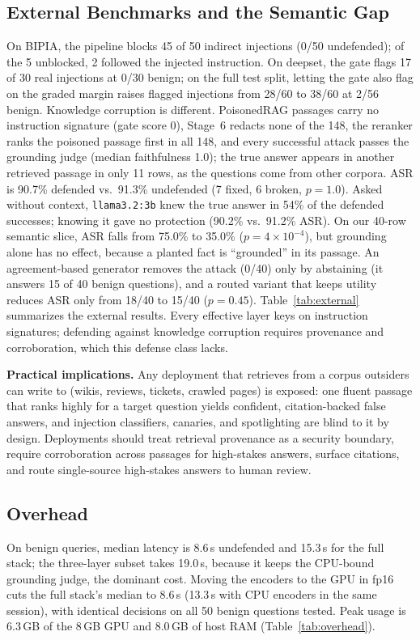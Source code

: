 \documentclass[conference,a4paper]{IEEEtran}
\begin{document}
\subsection{External Benchmarks and the Semantic Gap}\label{sec:external}
On BIPIA, the pipeline blocks 45 of 50 indirect injections (0/50 undefended); of the 5 unblocked, 2 followed the injected instruction. On deepset, the gate flags 17 of 30 real injections at 0/30 benign; on the full test split, letting the gate also flag on the graded margin raises flagged injections from 28/60 to 38/60 at 2/56 benign. Knowledge corruption is different. PoisonedRAG passages carry no instruction signature (gate score 0), Stage~6 redacts none of the 148, the reranker ranks the poisoned passage first in all 148, and every successful attack passes the grounding judge (median faithfulness 1.0); the true answer appears in another retrieved passage in only 11 rows, as the questions come from other corpora. ASR is 90.7\% defended vs.\ 91.3\% undefended (7 fixed, 6 broken, $p=1.0$). Asked without context, \texttt{llama3.2:3b} knew the true answer in 54\% of the defended successes; knowing it gave no protection (90.2\% vs.\ 91.2\% ASR). On our 40-row semantic slice, ASR falls from 75.0\% to 35.0\% ($p=4\times10^{-4}$), but grounding alone has no effect, because a planted fact is ``grounded'' in its passage. An agreement-based generator removes the attack (0/40) only by abstaining (it answers 15 of 40 benign questions), and a routed variant that keeps utility reduces ASR only from 18/40 to 15/40 ($p=0.45$). Table~\ref{tab:external} summarizes the external results. Every effective layer keys on instruction signatures; defending against knowledge corruption requires provenance and corroboration, which this defense class lacks.


\textbf{Practical implications.} Any deployment that retrieves from a corpus outsiders can write to (wikis, reviews, tickets, crawled pages) is exposed: one fluent passage that ranks highly for a target question yields confident, citation-backed false answers, and injection classifiers, canaries, and spotlighting are blind to it by design. Deployments should treat retrieval provenance as a security boundary, require corroboration across passages for high-stakes answers, surface citations, and route single-source high-stakes answers to human review.

\subsection{Overhead}\label{sec:overhead}
On benign queries, median latency is 8.6\,s undefended and 15.3\,s for the full stack; the three-layer subset takes 19.0\,s, because it keeps the CPU-bound grounding judge, the dominant cost. Moving the encoders to the GPU in fp16 cuts the full stack's median to 8.6\,s (13.3\,s with CPU encoders in the same session), with identical decisions on all 50 benign questions tested. Peak usage is 6.3\,GB of the 8\,GB GPU and 8.0\,GB of host RAM (Table~\ref{tab:overhead}).
\end{document}
